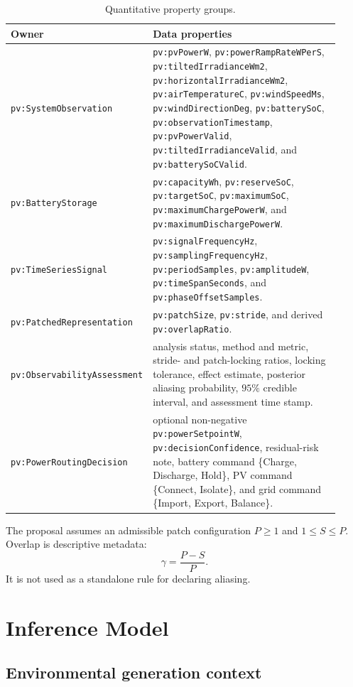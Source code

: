 \documentclass[
	letterpaper,
	10pt,
	unnumberedsections,
	twoside,
]{LTJournalArticle}
\newcommand{\pv}[1]{\texttt{pv:#1}}
\begin{document}
\begin{table}[htbp]
\centering
\caption{Quantitative property groups.}
\label{tab:data}
\small
\begin{tabular}{@{}L{0.29\linewidth}L{0.63\linewidth}@{}}
\toprule
\textbf{Owner} & \textbf{Data properties} \\
\midrule
\pv{SystemObservation} & \pv{pvPowerW}, \pv{powerRampRateWPerS}, \pv{tiltedIrradianceWm2}, \pv{horizontalIrradianceWm2}, \pv{airTemperatureC}, \pv{windSpeedMs}, \pv{windDirectionDeg}, \pv{batterySoC}, \pv{observationTimestamp}, \pv{pvPowerValid}, \pv{tiltedIrradianceValid}, and \pv{batterySoCValid}. \\
\pv{BatteryStorage} & \pv{capacityWh}, \pv{reserveSoC}, \pv{targetSoC}, \pv{maximumSoC}, \pv{maximumChargePowerW}, and \pv{maximumDischargePowerW}. \\
\pv{TimeSeriesSignal} & \pv{signalFrequencyHz}, \pv{samplingFrequencyHz}, \pv{periodSamples}, \pv{amplitudeW}, \pv{timeSpanSeconds}, and \pv{phaseOffsetSamples}. \\
\pv{PatchedRepresentation} & \pv{patchSize}, \pv{stride}, and derived \pv{overlapRatio}. \\
\pv{ObservabilityAssessment} & analysis status, method and metric, stride- and patch-locking ratios, locking tolerance, effect estimate, posterior aliasing probability, $95\%$ credible interval, and assessment time stamp. \\
\pv{PowerRoutingDecision} & optional non-negative \pv{powerSetpointW}, \pv{decisionConfidence}, residual-risk note, battery command \{Charge, Discharge, Hold\}, PV command \{Connect, Isolate\}, and grid command \{Import, Export, Balance\}. \\
\bottomrule
\end{tabular}
\end{table}

The proposal assumes an admissible patch configuration $P\geq1$ and $1\leq S\leq P$. Overlap is descriptive metadata:
\begin{equation}
\gamma=\frac{P-S}{P}.
\label{eq:overlap}
\end{equation}
It is not used as a standalone rule for declaring aliasing.

\section{Inference Model}

\subsection{Environmental generation context}
\end{document}
